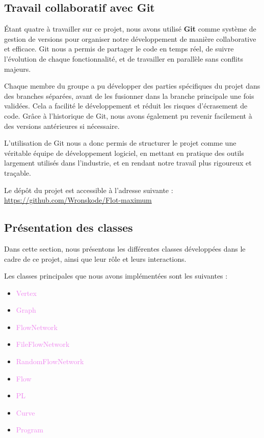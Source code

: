 \documentclass[a4paper]{article}
\begin{document}
\subsection{Travail collaboratif avec Git}

Étant quatre à travailler sur ce projet, nous avons utilisé \textbf{Git} comme système de gestion de versions pour organiser notre développement de manière collaborative et efficace. Git nous a permis de partager le code en temps réel, de suivre l’évolution de chaque fonctionnalité, et de travailler en parallèle sans conflits majeurs.

Chaque membre du groupe a pu développer des parties spécifiques du projet dans des branches séparées, avant de les fusionner dans la branche principale une fois validées. Cela a facilité le développement et réduit les risques d’écrasement de code. Grâce à l’historique de Git, nous avons également pu revenir facilement à des versions antérieures si nécessaire.

L'utilisation de Git nous a donc permis de structurer le projet comme une véritable équipe de développement logiciel, en mettant en pratique des outils largement utilisés dans l'industrie, et en rendant notre travail plus rigoureux et traçable.

Le dépôt du projet est accessible à l’adresse suivante :  
\url{https://github.com/Wronskode/Flot-maximum}



\subsection{Présentation des classes}

Dans cette section, nous présentons les différentes classes développées dans le cadre de ce projet, ainsi que leur rôle et leurs interactions.

Les classes principales que nous avons implémentées sont les suivantes :

\begin{itemize}
    \item \textcolor{violet}{Vertex}
    \item \textcolor{violet}{Graph}
    \item \textcolor{violet}{FlowNetwork}
    \item \textcolor{violet}{FileFlowNetwork}
    \item \textcolor{violet}{RandomFlowNetwork}
    \item \textcolor{violet}{Flow}
    \item \textcolor{violet}{PL}
    \item \textcolor{violet}{Curve}
    \item \textcolor{violet}{Program}
\end{itemize}
\end{document}
